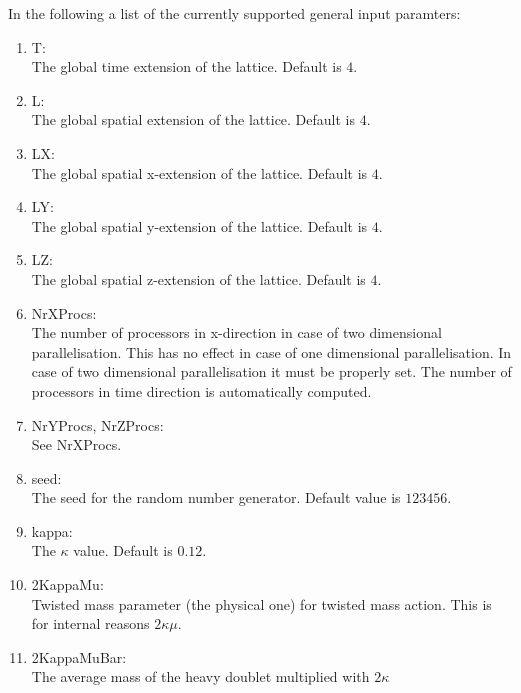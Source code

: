 In the following a list of the currently
supported general input paramters: 
\begin{enumerate}
\item {\ttfamily T}:\\
  The global time extension of the lattice. Default is $4$.

\item {\ttfamily L}:\\
  The global spatial extension of the lattice. Default is $4$.

\item {\ttfamily LX}:\\
  The global spatial x-extension of the lattice. Default is $4$.

\item {\ttfamily LY}:\\
  The global spatial y-extension of the lattice. Default is $4$.

\item {\ttfamily LZ}:\\
  The global spatial z-extension of the lattice. Default is $4$.

\item {\ttfamily NrXProcs}:\\
  The number of processors in x-direction in case of two dimensional
  parallelisation. This has no effect in case of one dimensional
  parallelisation. In case of two dimensional parallelisation it must
  be properly set. The number of processors in time direction is
  automatically computed.

\item {\ttfamily NrYProcs, NrZProcs}:\\
  See {\ttfamily NrXProcs}.

\item {\ttfamily seed}:\\
  The seed for the random number generator. Default value is $123456$.

\item {\ttfamily kappa}:\\
  The $\kappa$ value. Default is $0.12$.

\item {\ttfamily 2KappaMu}:\\
  Twisted mass parameter (the physical one) for twisted mass
  action. This is for internal reasons $2\kappa\mu$.

\item {\ttfamily 2KappaMuBar}:\\
  The average mass of the heavy doublet multiplied with $2\kappa$


\end{enumerate}
